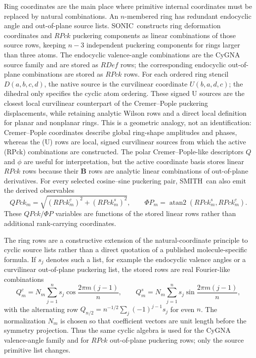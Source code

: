 \documentclass[journal=jctcce,manuscript=article,layout=traditional]{achemso}
\newcommand{\SONIC}{SONIC}
\newcommand{\SMITH}{\textsc{SMITH}}
\newcommand{\Bmat}{\mathbf{B}}
\theoremstyle{definition}
\begin{document}
Ring coordinates are the main place where primitive internal coordinates must
be replaced by natural combinations.  An \(n\)-membered ring has redundant
endocyclic angle and out-of-plane source lists.  \SONIC\ constructs ring deformation
coordinates and \(RPck\) puckering components as linear combinations of those
source rows, keeping \(n-3\) independent puckering components for rings larger
than three atoms.  The endocyclic valence-angle combinations are the CyGNA
source family and are stored as \(RDef\) rows; the corresponding endocyclic
out-of-plane combinations are stored as \(RPck\) rows.  For each ordered ring
stencil \(D(a,b,c,d)\), the native source is the curvilinear coordinate
\(U(b,a,d,c)\); the dihedral only specifies the cyclic atom ordering.  These
signed U sources are the closest local curvilinear counterpart of the
Cremer--Pople puckering displacements, while retaining analytic Wilson rows
and a direct local definition for planar and nonplanar rings.  This is a
geometric analogy, not an identification: Cremer--Pople coordinates describe
global ring-shape amplitudes and phases, whereas the (U) rows are local,
signed curvilinear sources from which the active (RPck) combinations are
constructed.  The polar
Cremer--Pople-like descriptors \(Q\) and \(\phi\) are useful for
interpretation, but the active coordinate basis stores linear \(RPck\) rows
because their \(\Bmat\) rows are analytic linear combinations of out-of-plane
derivatives.\cite{CremerPople1975}
For every selected cosine--sine puckering pair, \SMITH\ can also emit the
derived observables
\begin{equation}
\label{eq:puckering-polar-observables}
  QPck_m=\sqrt{(RPck_m^c)^2+(RPck_m^s)^2},\qquad
  \Phi P_m=\operatorname{atan2}(RPck_m^s,RPck_m^c).
\end{equation}
These \(QPck/\Phi P\) variables are functions of the stored linear rows rather
than additional rank-carrying coordinates.

The ring rows are a constructive extension of the natural-coordinate principle
to cyclic source lists rather than a direct quotation of a published
molecule-specific formula.  If \(s_j\) denotes such a list, for example the
endocyclic valence angles or a curvilinear out-of-plane puckering list, the stored rows are
real Fourier-like combinations
\begin{equation}
\label{eq:ring-fourier-combinations}
  Q_m^c = N_m\sum_{j=1}^{n} s_j\cos\frac{2\pi m(j-1)}{n},\qquad
  Q_m^s = N_m\sum_{j=1}^{n} s_j\sin\frac{2\pi m(j-1)}{n},
\end{equation}
with the alternating row \(Q_{n/2}=n^{-1/2}\sum_j(-1)^{j-1}s_j\) for even
\(n\).  The normalization \(N_m\) is chosen so that coefficient vectors are
unit length before the symmetry projection.  Thus the same cyclic algebra is
used for the CyGNA valence-angle family and for \(RPck\) out-of-plane puckering
rows; only the source primitive list changes.
\end{document}
